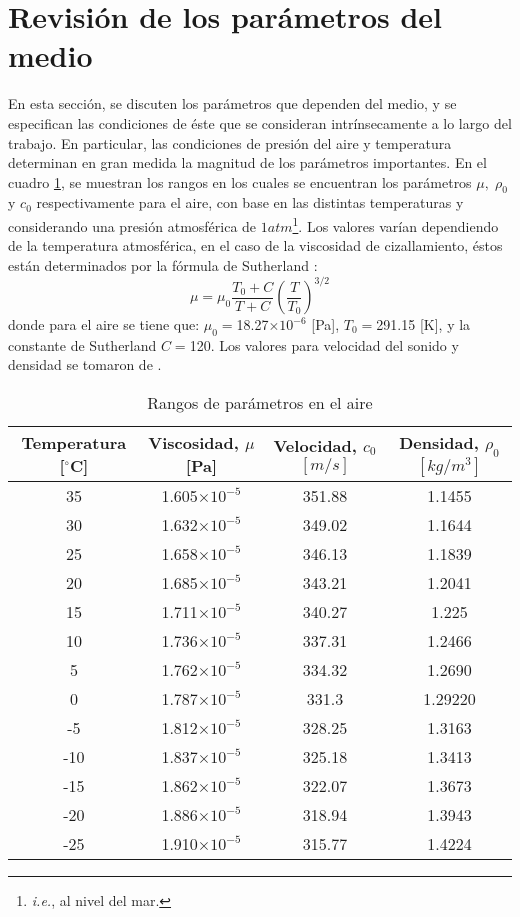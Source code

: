 \section{Revisión de los parámetros del medio}
En esta sección, se discuten los parámetros que dependen del medio, y se especifican las condiciones de éste que se consideran intrínsecamente a lo largo del trabajo. En particular, las condiciones de presión del aire y temperatura determinan en gran medida la magnitud de los parámetros importantes. En el cuadro \ref{tab:app3}, se muestran los rangos en los cuales se encuentran los parámetros $\mu,\; \rho_0$ y $c_0$ respectivamente para el aire, con base en las distintas temperaturas y considerando una presión atmosférica de $1 atm$\footnote{\emph{i.e.}, al nivel del mar.}. Los valores varían dependiendo de la temperatura atmosférica, en el caso de la viscosidad de cizallamiento, éstos están determinados por la fórmula de Sutherland \cite{wikiviscosidad}:
\[
\mu = \mu_0\frac{T_0+C}{T+C}\left(\frac{T}{T_0}\right)^{3\slash 2}
\]
donde para el aire se tiene que: $\mu_0 = $18.27$\times10^{-6}$ [Pa], $T_0 =$291.15 [K], y la constante de Sutherland $C=$120. Los valores para velocidad del sonido y densidad se tomaron de \cite{wikivelocidad}.
\begin{table}[hbpt]
\small
\centering
\caption{Rangos de parámetros en el aire}
\begin{tabular}{cccc}
\hline
Temperatura [$^{\circ}$C]& Viscosidad, $\mu$ [Pa] & Velocidad, $c_0$ $[m/s]$& Densidad, $\rho_0$ $[kg/m^3]$\\
\hline
35 & 1.605$\times 10^{-5}$ & 351.88 & 1.1455 \\
30 & 1.632$\times 10^{-5}$ & 349.02 & 1.1644 \\ 
25 & 1.658$\times 10^{-5}$ & 346.13 & 1.1839 \\ 
20 & 1.685$\times 10^{-5}$ & 343.21 & 1.2041 \\ 
15 & 1.711$\times 10^{-5}$ & 340.27 & 1.225 \\ 
10 & 1.736$\times 10^{-5}$ & 337.31 & 1.2466 \\ 
5 & 1.762$\times 10^{-5}$ & 334.32 & 1.2690 \\ 
0 & 1.787$\times 10^{-5}$ & 331.3 & 1.29220 \\ 
-5 & 1.812$\times 10^{-5}$ & 328.25 & 1.3163 \\ 
-10 & 1.837$\times 10^{-5}$ & 325.18 & 1.3413 \\ 
-15 & 1.862$\times 10^{-5}$ & 322.07 & 1.3673 \\ 
-20 & 1.886$\times 10^{-5}$ & 318.94 & 1.3943 \\ 
-25 & 1.910$\times 10^{-5}$ & 315.77 & 1.4224 \\ 
\hline
\end{tabular}
\label{tab:app3}
\end{table}
